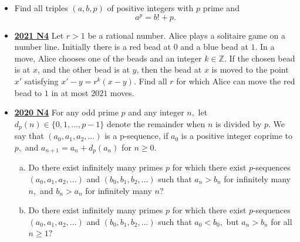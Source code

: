 \documentclass[11pt]{scrartcl}
\begin{document}
\begin{itemize}[leftmargin=*]
    \item  {} Find all triples $(a,b,p)$ of positive integers with $p$ prime and\[ a^p=b!+p.\] 
\item  \href{https://artofproblemsolving.com/community/c6h2882562p25627605}{\textbf{2021 N4}} Let $r>1$ be a rational number. Alice plays a solitaire game on a number line. Initially there is a red bead at $0$ and a blue bead at $1$. In a move, Alice chooses one of the beads and an integer $k \in \mathbb{Z}$. If the chosen bead is at $x$, and the other bead is at $y$, then the bead at $x$ is moved to the point $x'$ satisfying $x'-y=r^k(x-y)$. Find all $r$ for which Alice can move the red bead to $1$ in at most $2021$ moves.
\item  \href{https://artofproblemsolving.com/community/c6h2625856p22698019}{\textbf{2020 N4}} For any odd prime $p$ and any integer $n,$ let $d_p (n) \in \{ 0,1, \dots, p-1 \}$ denote the remainder when $n$ is divided by $p.$ We say that $(a_0, a_1, a_2, \dots)$ is a p-sequence, if $a_0$ is a positive integer coprime to $p,$ and $a_{n+1} =a_n + d_p (a_n)$ for $n \geqslant  0.$ 
\begin{enumerate}[(a)]
    \item Do there exist infinitely many primes $p$ for which there exist $p$-sequences $(a_0, a_1, a_2, \dots)$ and $(b_0, b_1, b_2, \dots)$ such that $a_n >b_n$ for infinitely many $n,$ and $b_n > a_n$ for infinitely many $n?$ 
    \item Do there exist infinitely many primes $p$ for which there exist $p$-sequences $(a_0, a_1, a_2, \dots)$ and $(b_0, b_1, b_2, \dots)$ such that $a_0 <b_0,$ but $a_n >b_n$ for all $n \geqslant  1?$
\end{enumerate}


\end{itemize}
\end{document}
